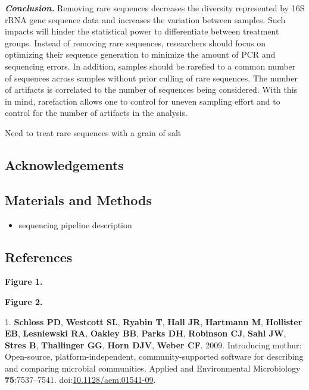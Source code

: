 \documentclass[]{article}
\begin{document}
\textbf{\emph{Conclusion.}} Removing rare sequences decreases the
diversity represented by 16S rRNA gene sequence data and increases the
variation between samples. Such impacts will hinder the statistical
power to differentiate between treatment groups. Instead of removing
rare sequences, researchers should focus on optimizing their sequence
generation to minimize the amount of PCR and sequencing errors. In
addition, samples should be rarefied to a common number of sequences
across samples without prior culling of rare sequences. The number of
artifacts is correlated to the number of sequences being considered.
With this in mind, rarefaction allows one to control for uneven sampling
effort and to control for the number of artifacts in the analysis.

Need to treat rare sequences with a grain of salt

\newpage

\subsection{Acknowledgements}\label{acknowledgements}

\newpage

\subsection{Materials and Methods}\label{materials-and-methods}

\begin{itemize}
\itemsep1pt\parskip0pt
\item
  sequencing pipeline description
\end{itemize}

\newpage

\subsection{References}\label{references}

\newpage

\textbf{Figure 1.}

\newpage

\textbf{Figure 2.}

1. \textbf{Schloss PD}, \textbf{Westcott SL}, \textbf{Ryabin T},
\textbf{Hall JR}, \textbf{Hartmann M}, \textbf{Hollister EB},
\textbf{Lesniewski RA}, \textbf{Oakley BB}, \textbf{Parks DH},
\textbf{Robinson CJ}, \textbf{Sahl JW}, \textbf{Stres B},
\textbf{Thallinger GG}, \textbf{Horn DJV}, \textbf{Weber CF}. 2009.
Introducing mothur: Open-source, platform-independent,
community-supported software for describing and comparing microbial
communities. Applied and Environmental Microbiology
\textbf{75}:7537--7541.
doi:\href{http://dx.doi.org/10.1128/aem.01541-09}{10.1128/aem.01541-09}.
\end{document}
